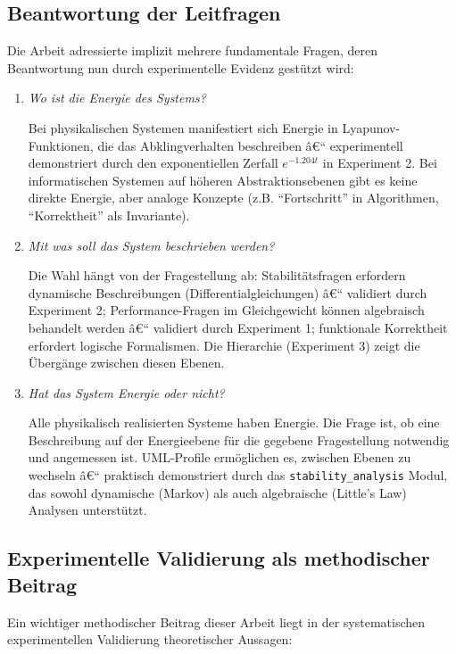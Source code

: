 ﻿\documentclass[a4paper,12pt]{report}
\theoremstyle{definition}
\begin{document}
\subsection{Beantwortung der Leitfragen}

Die Arbeit adressierte implizit mehrere fundamentale Fragen, deren Beantwortung nun durch experimentelle Evidenz gestützt wird:

\begin{enumerate}
	\item[-] \textit{Wo ist die Energie des Systems?} 
	
	Bei physikalischen Systemen manifestiert sich Energie in Lyapunov-Funktionen, die das Abklingverhalten beschreiben â€“ experimentell demonstriert durch den exponentiellen Zerfall $e^{-1.204t}$ in Experiment 2. Bei informatischen Systemen auf höheren Abstraktionsebenen gibt es keine direkte Energie, aber analoge Konzepte (z.B. ``Fortschritt'' in Algorithmen, ``Korrektheit'' als Invariante).
	
	\item[-] \textit{Mit was soll das System beschrieben werden?}
	
	Die Wahl hängt von der Fragestellung ab: Stabilitätsfragen erfordern dynamische Beschreibungen (Differentialgleichungen) â€“ validiert durch Experiment 2; Performance-Fragen im Gleichgewicht können algebraisch behandelt werden â€“ validiert durch Experiment 1; funktionale Korrektheit erfordert logische Formalismen. Die Hierarchie (Experiment 3) zeigt die Übergänge zwischen diesen Ebenen.
	
	\item[-] \textit{Hat das System Energie oder nicht?}
	
	Alle physikalisch realisierten Systeme haben Energie. Die Frage ist, ob eine Beschreibung auf der Energieebene für die gegebene Fragestellung notwendig und angemessen ist. UML-Profile ermöglichen es, zwischen Ebenen zu wechseln â€“ praktisch demonstriert durch das \texttt{stability\_analysis} Modul, das sowohl dynamische (Markov) als auch algebraische (Little's Law) Analysen unterstützt.
\end{enumerate}

\subsection{Experimentelle Validierung als methodischer Beitrag}

Ein wichtiger methodischer Beitrag dieser Arbeit liegt in der systematischen experimentellen Validierung theoretischer Aussagen:
\end{document}
